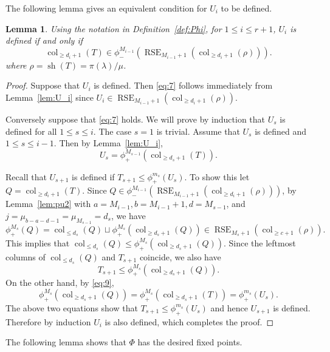 \documentclass{amsart}
\numberwithin{equation}{section}
\newtheorem{lem}[thm]{Lemma}
\theoremstyle{definition}
\newcommand\sh{\operatorname{sh}}
\newcommand\col{\operatorname{col}}
\newcommand\pd{\phi_+}
\newcommand\pu{\phi_-}
\newcommand\RSE{\operatorname{RSE}}
\begin{document}
The following lemma gives an equivalent condition for $U_i$ to be defined.

\begin{lem}\label{lem:U_i2}
  Using the notation in Definition~\ref{def:Phi}, for $1\le i\le r+1$, $U_{i}$ is
  defined if and only if
  \begin{equation}
    \label{eq:7}
  \col_{\ge d_i+1}(T)\in \pu^{M_{i-1}}(\RSE_{M_{i-1}+1}(\col_{\ge d_i+1}(\rho))).    
  \end{equation}
where $\rho=\sh(T)=\pi(\lambda)/\mu$. 
\end{lem}
\begin{proof}
  Suppose that $U_i$ is defined. Then \eqref{eq:7} follows immediately from
  Lemma~\ref{lem:U_i} since $U_{i}\in\RSE_{M_{i-1}+1}(\col_{\ge d_i+1}(\rho))$.

  Conversely suppose that \eqref{eq:7} holds. We will prove by induction that
  $U_s$ is defined for all $1\le s\le i$. The case $s=1$ is trivial. Assume that
  $U_{s}$ is defined and $1\le s\le i-1$. Then by Lemma~\ref{lem:U_i},
  \begin{equation}
    \label{eq:9}
U_s=\pd^{M_{s-1}}(\col_{\ge d_s+1}(T)).
  \end{equation}

  Recall that $U_{s+1}$ is defined if $T_{s+1}\le\pd^{m_s}(U_s)$. To show this
  let $Q=\col_{\ge d_i+1}(T)$. Since
  $Q\in\pu^{M_{i-1}}(\RSE_{M_{i-1}+1}(\col_{\ge d_i+1}(\rho)))$, by
  Lemma~\ref{lem:pu2} with $a=M_{i-1}, b=M_{i-1}+1, d=M_{s-1}$, and
  $j=\mu_{b-a-d-1}=\mu_{M_{s-1}}=d_s$, we have
  \begin{equation}
    \label{eq:4}
    \pd^{M_s}(Q) = \col_{\le d_s}(Q)\sqcup \pd^{M_s}(\col_{\ge d_s+1}(Q))
  \in \RSE_{M_s+1}(\col_{\ge c+1}(\rho)).
  \end{equation}
  This implies that $\col_{\le d_s}(Q)\le \pd^{M_s}(\col_{\ge d_s+1}(Q))$.
  Since the leftmost columns of $\col_{\le d_s}(Q)$ and $T_{s+1}$ coincide, we
  also have
\[
T_{s+1}\le \pd^{M_s}(\col_{\ge d_s+1}(Q)).
\]
 On the other hand, by \eqref{eq:9}, 
\[
  \pd^{M_s}(\col_{\ge d_s+1}(Q)) = \pd^{M_s}(\col_{\ge d_s+1}(T)) =
  \pd^{m_s}(U_s).
\]
The above two equations show that $T_{s+1}\le \pd^{m_s}(U_s)$ and hence
$U_{s+1}$ is defined. Therefore by induction $U_i$ is also defined, which
completes the proof.
\end{proof}


The following lemma shows that $\Phi$ has the desired fixed points. 
\end{document}
